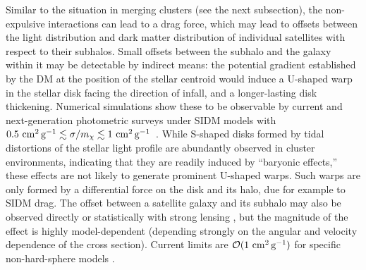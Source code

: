 
Similar to the situation in merging clusters (see the next subsection), the non-expulsive interactions can lead to a drag force, which may lead to offsets between the light distribution and dark matter distribution of individual satellites with respect to their subhalos. Small offsets between the subhalo and the galaxy within it may be detectable by indirect means: the potential gradient established by the DM at the position of the stellar centroid would induce a U-shaped warp in the stellar disk facing the direction of infall, and a longer-lasting disk thickening. Numerical simulations show these to be observable by current and next-generation photometric surveys under SIDM models with $0.5 \mathrm{\,\mathrm{\,cm}^2\mathrm{\,g}^{-1}} \lesssim \sigma/m_\chi \lesssim 1 \mathrm{\,\mathrm{\,cm}^2\mathrm{\,g}^{-1}}$~\citep{Secco}. While S-shaped disks formed by tidal distortions of the stellar light profile are abundantly observed in cluster environments, indicating that they are readily induced by ``baryonic effects,'' these effects are not likely to generate prominent U-shaped warps. Such warps are only formed by a differential force on the disk and its halo, due for example to SIDM drag.  The offset between a satellite galaxy and its subhalo may also be observed directly or statistically with strong lensing \citep{Massey2011,Massey:2017cwf}, but the magnitude of the effect is highly model-dependent (depending strongly on the angular  and velocity dependence of the cross section).  Current limits are $\mathcal{O}(1\mathrm{\,\mathrm{\,cm}^2\mathrm{\,g}^{-1}})$ for specific non-hard-sphere models \citep{Harvey:2015hha}.  

\vspace{1em} 
\label{sec:merging_clusters}

